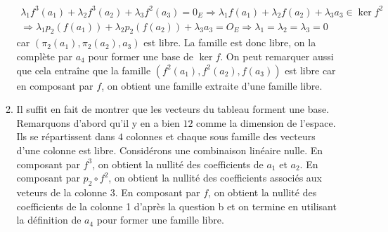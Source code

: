 \begin{enumerate}
\begin{enumerate}
\begin{multline*}
 \lambda_1f^3(a_1)+\lambda_2f^3(a_2)+\lambda_3f^2(a_3)=0_E
\Rightarrow \lambda_1f(a_1)+\lambda_2f(a_2)+\lambda_3a_3 \in \ker f^2\\
\Rightarrow \lambda_1p_2(f(a_1))+\lambda_2p_2(f(a_2))+\lambda_3a_3 = O_E 
\Rightarrow \lambda_1 = \lambda_2 = \lambda_3 = 0
\end{multline*}
car $(\pi_2(a_1),\pi_2(a_2),a_3)$ est libre. La famille est donc libre, on la complète par $a_4$ pour former une base de $\ker f$. On peut remarquer aussi que cela entraîne que la famille $(f^2(a_1),f^2(a_2),f(a_3))$ est libre car en composant par $f$, on obtient une famille extraite d'une famille libre.
 \item Il suffit en fait de montrer que les vecteurs du tableau forment une base. Remarquons d'abord qu'il y en a bien $12$ comme la dimension de l'espace.\newline
Ils se répartissent dans $4$ colonnes et chaque sous famille des vecteurs d'une colonne est libre. Considérons une combinaison linéaire nulle. En composant par $f^3$, on obtient la nullité des coefficients de $a_1$ et $a_2$. En composant par $p_2\circ f^2$, on obtient la nullité des coefficients associés aux veteurs de la colonne 3. En composant par $f$, on obtient la nullité des coefficients de la colonne 1 d'après la question b et on termine en utilisant la définition de $a_4$ pour former une famille libre.
\end{enumerate}

\end{enumerate}
